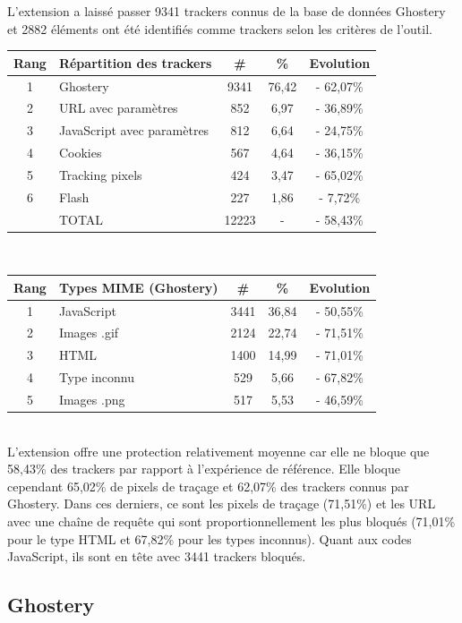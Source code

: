 L'extension a laissé passer 9341 trackers connus de la base de données Ghostery et 2882 éléments ont été identifiés comme trackers selon les critères de l'outil.\\

\begin{tabular}{ c | p{5cm} | c | c || c | }
   Rang & Répartition des trackers & \# & \% & Evolution \\
   \hline
   \hline
   1 & Ghostery & 9341 & 76,42 & - 62,07\% \\
   2 & URL avec paramètres & 852 & 6,97 & - 36,89\% \\
   3 & JavaScript avec paramètres & 812 & 6,64 & - 24,75\% \\
   4 & Cookies & 567 & 4,64 & - 36,15\% \\
   5 & Tracking pixels & 424 & 3,47 & - 65,02\% \\
   6 & Flash & 227 & 1,86 & - 7,72\% \\
   \hline
    & TOTAL & 12223 & - & - 58,43\%\\
   \hline
\end{tabular}
\\[1cm]

\begin{tabular}{ c | p{5cm} | c | c | c | }
   Rang & Types MIME (Ghostery) & \# & \% & Evolution\\
   \hline
   \hline
   1 & JavaScript & 3441 & 36,84 & - 50,55\% \\
   2 & Images .gif & 2124 & 22,74 & - 71,51\% \\
   3 & HTML & 1400 & 14,99 & - 71,01\% \\
   4 & Type inconnu & 529 & 5,66 & - 67,82\% \\
   5 & Images .png & 517 & 5,53 & - 46,59\% \\
   \hline
\end{tabular}
\\[.3cm]

L'extension offre une protection relativement moyenne car elle ne bloque que 58,43\% des trackers par rapport à l'expérience de référence. Elle bloque cependant 65,02\% de pixels de traçage et 62,07\% des trackers connus par Ghostery. Dans ces derniers, ce sont les pixels de traçage (71,51\%) et les URL avec une chaîne de requête qui sont proportionnellement les plus bloqués (71,01\% pour le type HTML et 67,82\% pour les types inconnus). Quant aux codes JavaScript, ils sont en tête avec 3441 trackers bloqués.

\subsection{Ghostery}
